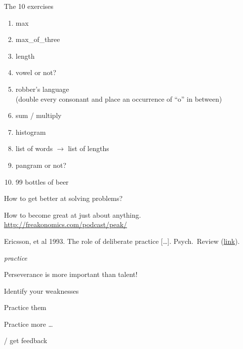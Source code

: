 \documentclass[aspectratio=169,usenames,dvipsnames]{beamer}
\begin{document}
\begin{frame}{The 10 exercises}
    \begin{enumerate}
        \item max
        \item max\_of\_three
        \item length
        \item vowel or not?
        \item robber's language \\
            (double every consonant and place an occurrence of ``o'' in between)
        \item sum / multiply
        \item histogram
        \item list of words $\rightarrow$ list of lengths
        \item pangram or not?
        \item 99 bottles of beer
    \end{enumerate}
\end{frame}

\begin{frame}{How to get better at solving problems?}
    \begin{reference}
        How to become great at just about anything. \url{http://freakonomics.com/podcast/peak/}

        Ericsson, et al 1993. The role of deliberate practice [\dots]. Psych.\ Review
        (\href{http://graphics8.nytimes.com/images/blogs/freakonomics/pdf/DeliberatePractice(PsychologicalReview).pdf}{link}).
    \end{reference}
    {\centering\Huge\em
     practice}

    \pause\vspace{3em}
    Perseverance is more important than talent!

    \begin{description}[Dedication:]
        \item[Planning:] Identify your weaknesses
        \item[Dedication:] Practice them
        \item[Repetition:] Practice more \dots
        \item[Reflect] / get feedback
    \end{description}


\end{frame}
\end{document}
